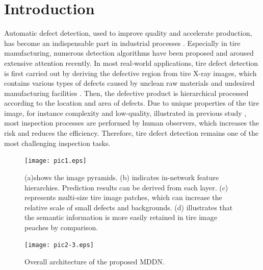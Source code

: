 \documentclass{article}
\begin{document}
\section{Introduction}
\label{sec:intro}
Automatic defect detection, used to improve quality and accelerate production, has become an indispensable part in industrial processes \cite{kumar2008computer,li2016deformable,ghorai2012automatic}. Especially in tire manufacturing, numerous detection algorithms have been proposed \cite{zhang2013texture,zhang2018tire,xiang2014dictionary} and aroused extensive attention recently. In most real-world applications, tire defect detection is first carried out by deriving the defective region from tire X-ray images, which contains various types of defects caused by unclean raw materials and undesired manufacturing facilities \cite{guo2016defect}. Then, the defective product is hierarchical processed according to the location and area of defects. Due to unique properties of the tire image, for instance complexity and low-quality, illustrated in previous study \cite{zhang2013defect,wang2019tire}, most inspection processes are performed by human observers, which increases the risk and reduces the efficiency. Therefore, tire defect detection remains one of the most challenging inspection tasks.
\begin{figure}[t]
  \centering
  \centerline{\texttt{[image: pic1.eps]}}
  \caption{(a)shows the image pyramids. (b) indicates in-network feature hierarchies. Prediction results can be derived from each layer. (c) represents multi-size tire image patches, which can increase the relative scale of small defects and backgrounds. (d) illustrates that the semantic information is more easily retained in tire image peaches by comparison.}
\end{figure}
\begin{figure}[t]
  \centering
  \centerline{\texttt{[image: pic2-3.eps]}}
  \caption{Overall architecture of the proposed MDDN. }
\end{figure}
\end{document}
